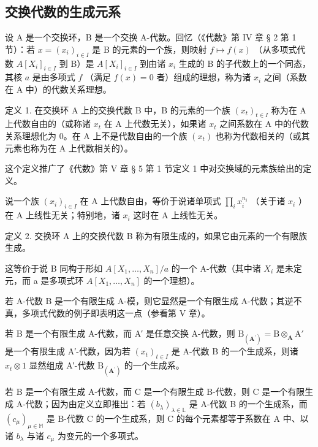 \subsection{交换代数的生成元系}

设 A 是一个交换环，B 是一个交换 A-代数。回忆（《代数》第 IV 章 § 2 第 1 节）：若 \(x = (x_{i})_{i \in I}\) 是 B 的元素的一个族，则映射 \(f \mapsto f(x)\) （从多项式代数 \(A[X_{i}]_{i \in I}\) 到 B）是 \(A[X_{i}]_{i \in I}\) 到由诸 \(x_{i}\) 生成的 B 的子代数上的一个同态，其核 \(a\) 是由多项式 \(f\) （满足 \(f(x) = 0\) 者）组成的理想，称为诸 \(x_{i}\) 之间（系数在 A 中）的代数关系理想。

定义 1. 在交换环 A 上的交换代数 B 中，B 的元素的一个族 \((x_{t})_{t\in I}\) 称为在 A 上代数自由的（或称诸 \(x_{t}\) 在 A 上代数无关），如果诸 \(x_{t}\) 之间系数在 A 中的代数关系理想化为 0。在 A 上不是代数自由的一个族 \((x_{t})\) 也称为代数相关的（或其元素也称为在 A 上代数相关的）。

这个定义推广了《代数》第 V 章 § 5 第 1 节定义 1 中对交换域的元素族给出的定义。

说一个族 \((x_{i})_{i\in I}\) 在 A 上代数自由，等价于说诸单项式 \(\prod_{i}x_{i}^{n_{i}}\) （关于诸 \(x_{i}\) ）在 A 上线性无关；特别地，诸 \(x_{i}\) 这时在 A 上线性无关。

定义 2. 交换环 A 上的交换代数 B 称为有限生成的，如果它由元素的一个有限族生成。

这等价于说 B 同构于形如 \(A[X_{1},\ldots,X_{n}]/a\) 的一个 A-代数（其中诸 \(X_{i}\) 是未定元，而 a 是多项式环 \(A[X_{1},\ldots,X_{n}]\) 的一个理想）。

若 A-代数 B 是一个有限生成 A-模，则它显然是一个有限生成 A-代数；其逆不真，多项式代数的例子即表明这一点（参看第 V 章）。

若 B 是一个有限生成 A-代数，而 A′ 是任意交换 A-代数，则 \(\mathrm{B}_{(\mathbf{A}^{\prime})} = \mathrm{B} \otimes_{\mathbf{A}} \mathrm{A}'\) 是一个有限生成 A′-代数，因为若 \((x_{t})_{t \in I}\) 是 A-代数 B 的一个生成系，则诸 \(x_{t} \otimes 1\) 显然组成 A′-代数 \(\mathrm{B}_{(\mathbf{A}^{\prime})}\) 的一个生成系。

若 B 是一个有限生成 A-代数，而 C 是一个有限生成 B-代数，则 C 是一个有限生成 A-代数；因为由定义立即推出：若 \((b_{\lambda})_{\lambda \in \mathbb{L}}\) 是 A-代数 B 的一个生成系，而 \((c_{\mu})_{\mu \in \mathbb{M}}\) 是 B-代数 C 的一个生成系，则 C 的每个元素都等于系数在 A 中、以诸 \(b_{\lambda}\) 与诸 \(c_{\mu}\) 为变元的一个多项式。

